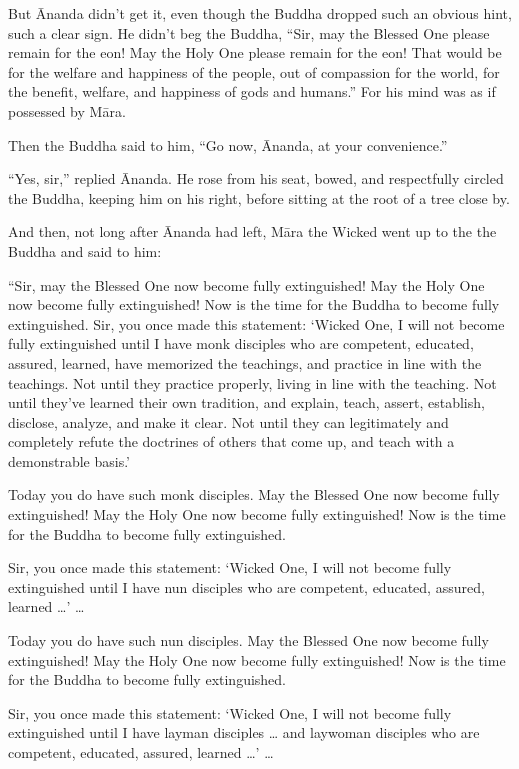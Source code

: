 \documentclass[12pt,openany]{book}%
\begin{document}
But Ānanda didn’t get it, even though the Buddha dropped such an obvious hint, such a clear sign. He didn’t beg the Buddha, “Sir, may the Blessed One please remain for the eon! May the Holy One please remain for the eon! That would be for the welfare and happiness of the people, out of compassion for the world, for the benefit, welfare, and happiness of gods and humans.” For his mind was as if possessed by \textsanskrit{Māra}. 

Then the Buddha said to him, “Go now, Ānanda, at your convenience.” 

“Yes, sir,” replied Ānanda. He rose from his seat, bowed, and respectfully circled the Buddha, keeping him on his right, before sitting at the root of a tree close by. 

And then, not long after Ānanda had left, \textsanskrit{Māra} the Wicked went up to the the Buddha and said to him: 

“Sir, may the Blessed One now become fully extinguished! May the Holy One now become fully extinguished! Now is the time for the Buddha to become fully extinguished. Sir, you once made this statement: ‘Wicked One, I will not become fully extinguished until I have monk disciples who are competent, educated, assured, learned, have memorized the teachings, and practice in line with the teachings. Not until they practice properly, living in line with the teaching. Not until they’ve learned their own tradition, and explain, teach, assert, establish, disclose, analyze, and make it clear. Not until they can legitimately and completely refute the doctrines of others that come up, and teach with a demonstrable basis.’ 

Today you do have such monk disciples. May the Blessed One now become fully extinguished! May the Holy One now become fully extinguished! Now is the time for the Buddha to become fully extinguished. 

Sir, you once made this statement: ‘Wicked One, I will not become fully extinguished until I have nun disciples who are competent, educated, assured, learned …’ … 

Today you do have such nun disciples. May the Blessed One now become fully extinguished! May the Holy One now become fully extinguished! Now is the time for the Buddha to become fully extinguished. 

Sir, you once made this statement: ‘Wicked One, I will not become fully extinguished until I have layman disciples … and laywoman disciples who are competent, educated, assured, learned …’ … 
\end{document}
